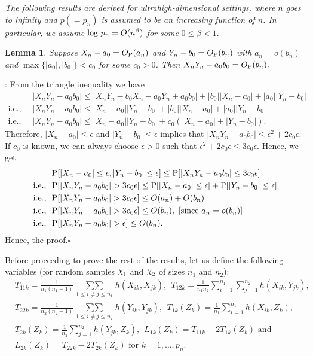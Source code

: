 \documentclass[twoside]{article}
\def\log{\hbox{log}}
\newcommand{\0}{\mathbf{0}}
\newcommand{\1}{\mathbf{1}}
\newcommand*{\QEDB}{\hfill\ensuremath{\square}}
\DeclareRobustCommand{\rchi}{{\mathpalette\irchi\relax}}
\newcommand{\irchi}[2]{\raisebox{\depth}{$#1\chi$}} %
\numberwithin{equation}{section}
\newtheorem{lemma}[thm]{Lemma}
\begin{document}
{\it The following results are derived for ultrahigh-dimensional settings, where $n$ goes to infinity and $p(=p_n)$ is assumed to be an increasing function of $n$. In particular, we assume} $\log\ p_n=O(n^\beta)$ {\it for some }$0\leq \beta<1$.
\begin{lemma}\label{supplemma}
Suppose $X_n - a_0 = O_{\rm P}(a_n)$ and $Y_n - b_0 = O_{\rm P}(b_n)$ with $a_n=o(b_n)$ and $\max\{|a_0|,|b_0|\}<c_0$ for some $c_0>0$. Then
$X_nY_n - a_0b_0 = O_{\rm P}(b_n).$
\end{lemma}

:
From the triangle inequality we have
\begin{align*}
 &\ |X_nY_n - a_0b_0|\leq |X_nY_n - b_0X_n - a_0Y_n + a_0b_0| + |b_0||X_n-a_0|+|a_0||Y_n-b_0|\\
 \text{i.e., }&\ |X_nY_n - a_0b_0|\leq |X_n-a_0||Y_n - b_0| + |b_0||X_n-a_0|+|a_0||Y_n-b_0|\\
 \text{i.e., }&\ |X_nY_n - a_0b_0|\leq |X_n-a_0||Y_n - b_0| + c_0(|X_n-a_0|+|Y_n-b_0|).
\end{align*}
Therefore, $|X_n-a_0|\leq \epsilon$ and $|Y_n-b_0|\leq \epsilon$ implies that $|X_nY_n - a_0b_0|\leq \epsilon^2 + 2c_0\epsilon$. If $c_0$ is known, we can always choose $\epsilon>0$ such that $\epsilon^2 + 2c_0\epsilon\leq 3c_0\epsilon$. Hence, we get
\begin{align*}
 &\ {\rm P}[|X_n-a_0|\leq \epsilon,|Y_n-b_0|\leq \epsilon]\leq {\rm P}[|X_nY_n - a_0b_0|\leq 3c_0\epsilon]\\
 \text{i.e., }&\ {\rm P}[|X_nY_n - a_0b_0|>3c_0\epsilon]\leq {\rm P}[|X_n-a_0|\leq \epsilon] + {\rm P}[|Y_n-b_0|\leq \epsilon]\\
 \text{i.e., }&\ {\rm P}[|X_nY_n - a_0b_0|>3c_0\epsilon]\leq O(a_n) +O(b_n)\\
 \text{i.e., }&\ {\rm P}[|X_nY_n - a_0b_0|>3c_0\epsilon]\leq O(b_n),\ [\text{since } a_n = o(b_n)]\\
 \text{i.e., }&\ {\rm P}[|X_nY_n - a_0b_0|>\epsilon]\leq O(b_n).
\end{align*}
Hence, the proof.\hfill\QEDB\newline

Before proceeding to prove the rest of the results, let us define the following variables (for random samples $\rchi_1$ and $\rchi_2$ of sizes $n_1$ and $n_2$):
\begin{align}\label{compdef}
 & {T}_{11k} = \frac{1}{n_1(n_1-1)}\mathop{\sum\sum}\limits_{1\leq i\neq j\leq n_1}{h}(X_{ik},X_{jk}), \ \ {T}_{12k} =\frac{1}{n_1n_2}\sum\limits_{ i=1}^{n_1}\sum\limits_{ j=1}^{n_2}{h}(X_{ik},Y_{jk}),\nonumber \\
 & {T}_{22k} = \frac{1}{n_2(n_2-1)}\mathop{\sum\sum}\limits_{1\leq i\neq j\leq n_2}{h}(Y_{ik},Y_{jk}), \ \ T_{1k}(Z_k) = \frac{1}{n_1}\sum\limits_{i=1}^{n_1}h(X_{ik},Z_k),\nonumber \\
 & T_{2k}(Z_k) = \frac{1}{n_2}\sum\limits_{j=1}^{n_2}h(Y_{jk},Z_k),\ \  L_{1k}(Z_k) = T_{11k} - 2T_{1k}(Z_k)\text{ and }\nonumber \\
 & L_{2k}(Z_k) = T_{22k} - 2T_{2k}(Z_k)\text{ for } k=1,\ldots, p_n.
\end{align}
\end{document}
